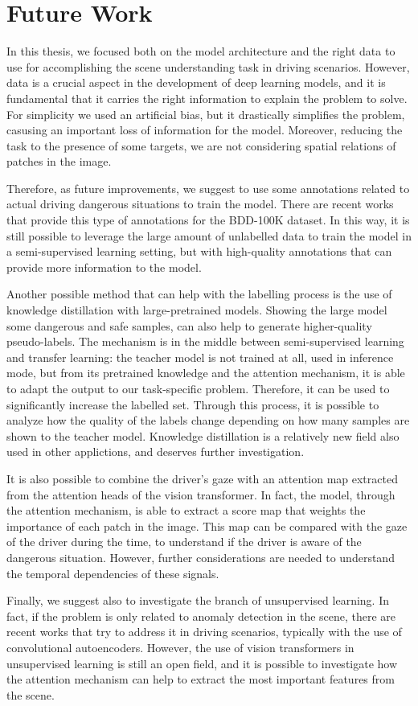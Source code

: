 \section{Future Work}
In this thesis, we focused both on the model architecture and the right data 
to use for accomplishing the scene understanding task in driving scenarios. 
However, data is a crucial aspect in the development of deep learning models, 
and it is fundamental that it carries the right information to explain the 
problem to solve. For simplicity we used an artificial bias, but it 
drastically simplifies the problem, casusing an important loss of information 
for the model. Moreover, reducing the task to the presence of some targets, 
we are not considering spatial relations of patches in the image.

Therefore, as future improvements, we suggest to use some annotations related 
to actual driving dangerous situations to train the model. There are recent works
\cite{bdd_a} that provide this type of annotations for the BDD-100K dataset.
In this way, it is still possible to leverage the large amount of unlabelled 
data to train the model in a semi-supervised learning setting, but with 
high-quality annotations that can provide more information to the model.

Another possible method that can help with the labelling process is the use of 
knowledge distillation with large-pretrained models. Showing the large model 
some dangerous and safe samples, can also help to generate higher-quality 
pseudo-labels. The mechanism is in the middle between semi-supervised learning 
and transfer learning: the teacher model is not trained at all, used in inference 
mode, but from its pretrained knowledge and the attention mechanism, it is able 
to adapt the output to our task-specific problem. Therefore, it can be used to 
significantly increase the labelled set. Through this process, it is possible to 
analyze how the quality of the labels change depending on how many samples are 
shown to the teacher model. Knowledge distillation is a relatively new field 
also used in other applictions, and deserves further investigation.
    
It is also possible to combine the driver's gaze with an attention map 
extracted from the attention heads of the vision transformer. In fact, the model, 
through the attention mechanism, is able to extract a score map that weights 
the importance of each patch in the image. This map can be compared with the 
gaze of the driver during the time, to understand if the driver is aware of 
the dangerous situation. However, further considerations are needed to understand 
the temporal dependencies of these signals.

Finally, we suggest also to investigate the branch of unsupervised learning. 
In fact, if the problem is only related to anomaly detection in the scene, 
there are recent works that try to address it in driving scenarios, typically 
with the use of convolutional autoencoders. However, the use of vision transformers 
in unsupervised learning is still an open field, and it is possible to investigate 
how the attention mechanism can help to extract the most important features 
from the scene.